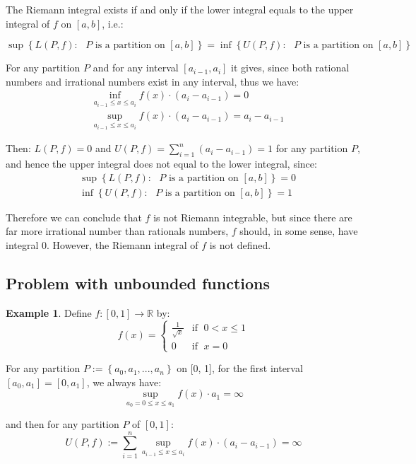 \documentclass[reqno]{amsart}
\theoremstyle{definition}
\newtheorem{example}{Example}
\begin{document}
The Riemann integral exists if and only if the lower integral equals to the upper integral of $f$ on $[a, b]$, i.e.:

$$
\sup\left\{L(P, f):\mbox{ $P$ is a partition on }[a, b]\right\} = \inf\left\{U(P, f):\mbox{ $P$ is a partition on }[a, b]\right\}
$$

For any partition $P$ and for any interval $[a_{i-1}, a_{i}]$ it gives, since both rational numbers and irrational numbers exist in any interval, thus we have:
\begin{align*}
&\inf_{\scriptscriptstyle a_{i-1}\leq x \leq a_{i}}{f(x)\cdot(a_{i}-a_{i-1})} = 0\\
&\sup_{\scriptscriptstyle a_{i-1}\leq x \leq a_{i}}{f(x)\cdot(a_{i}-a_{i-1})} = a_{i}-a_{i-1}
\end{align*}

Then: $L(P, f) = 0$ and $U(P,f) = \sum\limits^{n}_{i=1}(a_{i}-a_{i-1}) = 1$ for any partition $P$, and hence the upper integral does not equal to the lower integral, since:
\begin{align*}
&\sup\left\{L(P, f):\mbox{ $P$ is a partition on }[a, b]\right\} = 0\\
&\inf\left\{U(P, f):\mbox{ $P$ is a partition on }[a, b]\right\} = 1
\end{align*}

Therefore we can conclude that $f$ is not Riemann integrable, but since there are far more irrational number than rationals numbers, $f$ should, in some sense, have integral 0. However, the Riemann integral of $f$ is not defined.

\subsection{Problem with unbounded functions}
\begin{example}
Define $f: [0, 1] \rightarrow \mathbb{R}$ by:
$$
f(x)= 
\begin{cases}
\frac{1}{\sqrt{x}} & \text{if }\; 0 < x \leq 1\\
0 & \text{if }\; x = 0
\end{cases}
$$
\end{example}

For any partition $P:=  \left\{a_{0}, a_{1}, ..., a_{n}\right\}$ on [0, 1], for the first interval $[a_{0}, a_{1}] = [0, a_{1}]$, we always have:\\
$$
\sup_{\scriptscriptstyle a_{0}= 0 \leq x \leq a_{1}}f(x) \cdot a_{1} = \infty
$$

and then for any partition $P$ of $[0, 1]$:
$$
U(P, f):= \sum\limits^{n}_{i=1}\sup_{\scriptscriptstyle a_{i-1}\leq x \leq a_{i}}{f(x)\cdot(a_{i}-a_{i-1})} = \infty
$$ 
\end{document}
